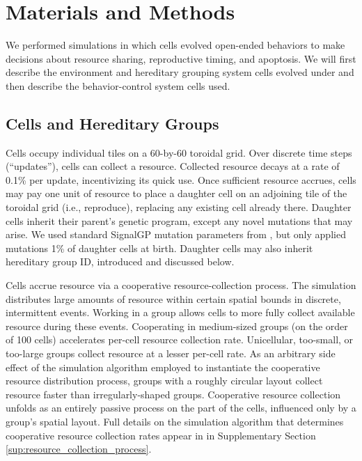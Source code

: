 \section{Materials and Methods}



We performed simulations in which cells evolved open-ended behaviors to make decisions about resource sharing, reproductive timing, and apoptosis.
We will first describe the environment and hereditary grouping system cells evolved under and then describe the behavior-control system cells used.

\subsection{Cells and Hereditary Groups}

Cells occupy individual tiles on a 60-by-60 toroidal grid.
Over discrete time steps (``updates''), cells can collect a resource.
Collected resource decays at a rate of 0.1\% per update, incentivizing its quick use.
Once sufficient resource accrues, cells may pay one unit of resource to place a daughter cell on an adjoining tile of the toroidal grid (i.e., reproduce), replacing any existing cell already there.
Daughter cells inherit their parent's genetic program, except any novel mutations that may arise.
We used standard SignalGP mutation parameters from \citep{lalejini2018evolving}, but only applied mutations 1\% of daughter cells at birth.
Daughter cells may also inherit hereditary group ID, introduced and discussed below.

Cells accrue resource via a cooperative resource-collection process.
The simulation distributes large amounts of resource within certain spatial bounds in discrete, intermittent events.
Working in a group allows cells to more fully collect available resource during these events.
Cooperating in medium-sized groups (on the order of 100 cells) accelerates per-cell resource collection rate.
Unicellular, too-small, or too-large groups collect resource at a lesser per-cell rate.
As an arbitrary side effect of the simulation algorithm employed to instantiate the cooperative resource distribution process, groups with a roughly circular layout collect resource faster than irregularly-shaped groups.
Cooperative resource collection unfolds as an entirely passive process on the part of the cells, influenced only by a group's spatial layout.
Full details on the simulation algorithm that determines cooperative resource collection rates appear in in Supplementary Section \ref{sup:resource_collection_process}.

